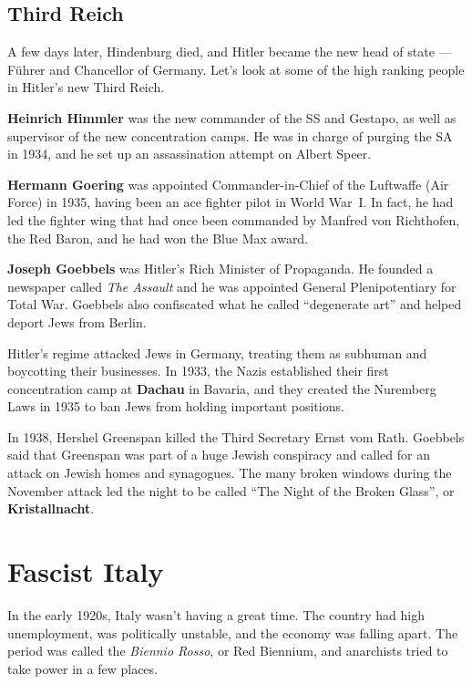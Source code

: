 \subsection*{Third Reich}

A few days later, Hindenburg died, and Hitler became the new head of state --- F\"uhrer and Chancellor of Germany.
Let's look at some of the high ranking people in Hitler's new Third Reich.

\textbf{Heinrich Himmler} was the new commander of the SS and Gestapo,
as well as supervisor of the new concentration camps.
He was in charge of purging the SA in 1934,
and he set up an assassination attempt on Albert Speer.

\textbf{Hermann Goering} was appointed Commander-in-Chief of the Luftwaffe (Air Force) in 1935,
having been an ace fighter pilot in World War~I.
In fact, he had led the fighter wing that had once been commanded by Manfred von Richthofen, the Red Baron,
and he had won the Blue Max award.

\textbf{Joseph Goebbels} was Hitler's Rich Minister of Propaganda.
He founded a newspaper called \textit{The Assault} and he was appointed General Plenipotentiary for Total War.
Goebbels also confiscated what he called ``degenerate art'' and helped deport Jews from Berlin.

Hitler's regime attacked Jews in Germany, treating them as subhuman and boycotting their businesses.
In 1933, the Nazis established their first concentration camp at \textbf{Dachau} in Bavaria,
and they created the Nuremberg Laws in 1935 to ban Jews from holding important positions.

In 1938, Hershel Greenspan killed the Third Secretary Ernst vom Rath.
Goebbels said that Greenspan was part of a huge Jewish conspiracy and
called for an attack on Jewish homes and synagogues.
The many broken windows during the November attack led the night to be called ``The Night of the Broken Glass'',
or \textbf{Kristallnacht}.

\section{Fascist Italy}

In the early 1920s, Italy wasn't having a great time.
The country had high unemployment, was politically unstable, and the economy was falling apart.
The period was called the \textit{Biennio Rosso}, or Red Biennium,
and anarchists tried to take power in a few places.

